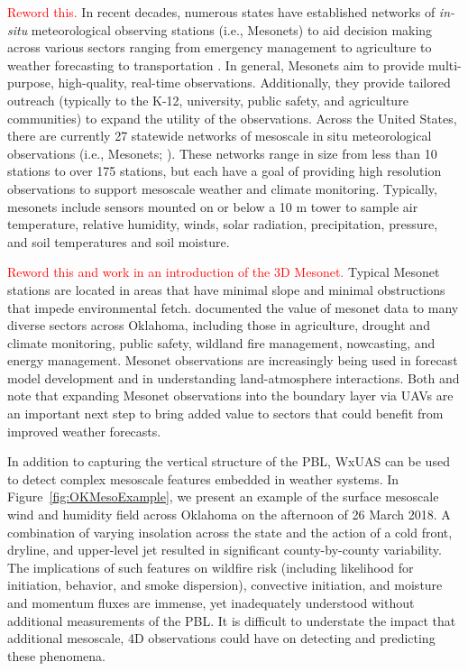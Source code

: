\documentclass[sensors,review,submit,moreauthors,pdftex,10pt,a4paper]{mdpi}
\theoremstyle{mdpi}
\newcounter{ex}
\newcounter{re}
\theoremstyle{mdpidefinition}
\begin{document}
\textcolor{red}{Reword this.} In recent decades, numerous states have established networks of \textit{in-situ} meteorological observing stations (i.e.,  Mesonets) to aid decision making across various sectors ranging from emergency management to agriculture to weather forecasting to transportation \citep{mahmood++2017_BAMS, ziolkowska++2017_WCAS}. In general, Mesonets aim to provide multi-purpose, high-quality, real-time observations. Additionally, they provide tailored outreach (typically to the K-12, university, public safety, and agriculture communities) to expand the utility of the observations. Across the United States, there are currently 27 statewide networks of mesoscale in situ meteorological observations (i.e., Mesonets; \cite{mahmood++2017_BAMS}). These networks range in size from less than 10 stations to over 175 stations, but each have a goal of providing high resolution observations to support mesoscale weather and climate monitoring. Typically, mesonets include sensors mounted on or below a 10 m tower to sample air temperature, relative humidity, winds, solar radiation, precipitation, pressure, and soil temperatures and soil moisture.

\textcolor{red}{Reword this and work in an introduction of the 3D Mesonet.} Typical Mesonet stations are located in areas that have minimal slope and minimal obstructions that impede environmental fetch. \citet{ziolkowska++2017_WCAS} documented the value of mesonet data to many diverse sectors across Oklahoma, including those in agriculture, drought and climate monitoring, public safety, wildland fire management, nowcasting, and energy management. Mesonet observations are increasingly being used in forecast model development and in understanding land-atmosphere interactions. Both \citet{mahmood++2017_BAMS} and \citet{ziolkowska++2017_WCAS} note that expanding Mesonet observations into the boundary layer via UAVs are an important next step to bring added value to sectors that could benefit from improved weather forecasts.

In addition to capturing the vertical structure of the PBL, WxUAS can be used to detect complex mesoscale features embedded in weather systems. In Figure~\ref{fig:OKMesoExample}, we present an example of the surface mesoscale wind and humidity field across Oklahoma on the afternoon of 26 March 2018. A combination of varying insolation across the state and the action of a cold front, dryline, and upper-level jet resulted in significant county-by-county variability. The implications of such features on wildfire risk (including likelihood for initiation, behavior, and smoke dispersion), convective initiation, and moisture and momentum fluxes are immense, yet inadequately understood without additional measurements of the PBL. It is difficult to understate the impact that additional mesoscale, 4D observations could have on detecting and predicting these phenomena.
\end{document}
